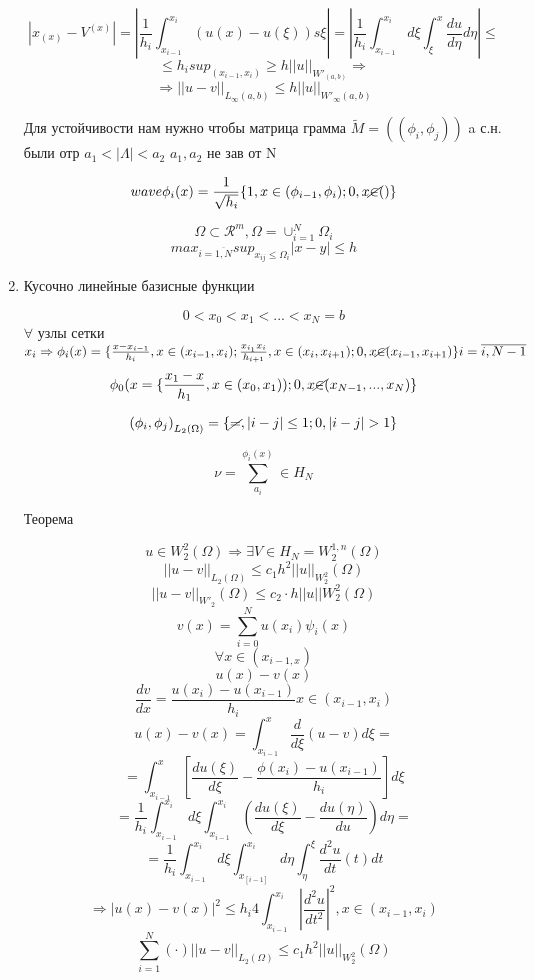 \documentclass[12pt, a4paper]{article}
\begin{document}
\begin{enumerate}
	\[ |x_{(x)} - V^{(x)}| = |\frac{1}{h_i} \int_{x_{i-1}}^{x_i} (u(x)- u(\xi))s \xi| = |\frac{1}{h_i} \int_{x_{i-1}}^{x_i} d\xi \int_{\xi}^{x} \frac{du}{d\eta} d \eta | \leq \]
	\[ \leq h_i {sup}_{(x_{i-1}, x_i)} \geq h {||u||}_{{W'}_{(a, b)}} \Rightarrow \]
	\[ \Rightarrow {||u -v||}_{L_{\infty}(a,b)} \leq h {||u||}_{{W'}_\infty (a, b)} \]

	Для устойчивости нам нужно чтобы матрица грамма $ \widetilde{M} = ((\phi_i, \phi_j)) $ a с.н. были отр $ a_1 < |\Lambda| < a_2 $ $ a_1, a_2 $ не зав от N

	\[ wave{\phi_i} (x) = \frac{1}{\sqrt{h_i}} \{1, x \in (\phi_{i-1}, \phi_i); 0, x \cancel{\in} () \} \]

	\[ \Omega \subset \mathcal{R}^m, \Omega = \cup^{N}_{i=1} \Omega_i \]
	\[ {max}_{i=\overline{1, N}} {sup}_{x_{ij} \leq \Omega_i} |x-y| \leq h \]

	\item Кусочно линейные базисные функции

	\[ 0 < x_0 < x_1 < ... < x_N = b \]
	$ \forall $ узлы сетки $ x_i \Rightarrow \phi_i (x) = \{ \frac{x-x_{i-1}}{h_i}, x\in (x_{i-1} , x_i); \frac{x_{i_1} x_i}{h_{i+1}}, x \in (x_{i}, x_{i+1}); 0, x \cancel{\in} (x_{i-1}, x_{i+1}) \} i = \overline{i, N-1} $
	\[ \phi_0(x = \{ \frac{x_1 -x}{h_1}, x \in (x_0, x_1)); 0, x\cancel{\in} (x_{N-1}, ..., x_N) \} \]


	\[ {(\phi_i, \phi_j)}_{L_2(\Omega)} = \{ \cancel{=} , |i-j| \leq 1; 0, |i-j| > 1 \} \]

	\[ \nu = \sum_{a_i}^{\phi_i(x)} \in H_N \]

	Теорема

	\[ u \in W_2^2 (\Omega) \Rightarrow \exists V \in H_N = W_2^{1, n} (\Omega) \]
	\[ {||u-v||}_{L_2(\Omega)} \leq c_1 h^2 ||u||_{W_2^2} (\Omega) \]
	\[ ||u-v||_{{W'}_2} (\Omega) \leq c_2 \cdot h ||u|| W_2^2 (\Omega) \]
	\[ v(x) = \sum_{i=0}^{N} u(x_i) \psi_i (x) \]
	\[ \forall x \in (x_{i-1, x}) \]
	\[ u(x) - v(x) \]
	\[ \frac{dv}{dx} = \frac{u(x_i) - u(x_{i-1})}{h_i} x\in (x_{i-1}, x_i) \]
	\[ u(x) - v(x) = \int_{x_{i-1}}^{x} \frac{d}{d\xi}(u-v) d\xi =\]
	\[ = \int_{x_{i-1}}^{x} [\frac{du(\xi)}{d\xi} - \frac{\phi(x_i) - u(x_{i-1})}{h_i}] d\xi \]
	\[ = \frac{1}{h_i} \int_{x_{i-1}}^{x_i} d\xi \int_{x_{i-1}}^{x_i} (\frac{du (\xi)}{d\xi} - \frac{du(\eta)}{du}) d\eta =  \]
	\[ = \frac{1}{h_i} \int_{x_{i-1}}^{x_i} d\xi \int_{x_[i-1]}^{x_i} d \eta \int_{\eta}^{\xi} \frac{d^2u}{dt} (t) dt \]
	\[ \Rightarrow |u(x) - v(x)|^2 \leq h_i 4 \int_{x_{i-1}}^{x_i} |\frac{d^2u}{dt^2}|^2, x \in (x_{i-1}, x_i) \]
	\[ \sum_{i=1}^{N} (\cdot) {||u-v||}_{L_2 (\Omega)} \leq c_1 h^2 {||u||}_{W^2_2} (\Omega)\]

\end{enumerate}
\end{document}
